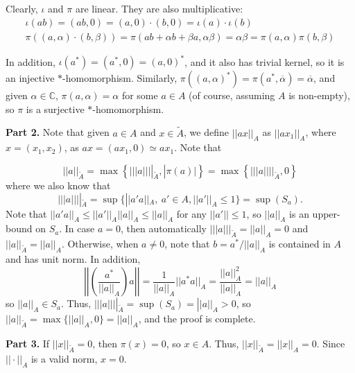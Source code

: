 \documentclass[aps,pra,showpacs,notitlepage,onecolumn,superscriptaddress,nofootinbib]{revtex4-1}
\theoremstyle{definition}
\begin{document}
Clearly, $\iota$ and $\pi$ are linear. They are also multiplicative:
\begin{align}
  \iota(ab) = (ab, 0) = (a, 0) \cdot (b, 0) = \iota(a) \cdot \iota(b) \\
  \pi((a, \alpha) \cdot (b, \beta)) = \pi(ab + \alpha b + \beta a, \alpha \beta) = \alpha \beta = \pi(a, \alpha) \pi(b, \beta)
  \end{align}

\noindent 
In addition, $\iota(a^{*}) = (a^{*}, 0) = (a, 0)^{*}$, and it also has trivial kernel, so it is an injective $*$-homomorphism. Similarly, $\pi((a, \alpha)^{*}) = \pi(a^{*}, \overline{\alpha}) = \overline{\alpha}$,
and given $\alpha \in \mathbb{C}$, $\pi(a, \alpha) = \alpha$ for some $a \in A$ (of course, assuming $A$ is non-empty), so $\pi$ is a surjective $*$-homomorphism.
\newline

\noindent \textbf{Part 2.} Note that given $a \in A$ and $x \in \widetilde{A}$, we define $||ax||_A$ as $||a x_1||_A$, where $x = (x_1, x_2)$, as $ax = (ax_1, 0) \simeq ax_1$. Note that

\begin{equation}
  ||a||_{\widetilde{A}} = \max \left\{ |||a||||_{\widetilde{A}}, |\pi(a)| \right\} = \max \left\{ |||a||||_{\widetilde{A}}, 0 \right\}
\end{equation}
where we also know that
\begin{equation}
  |||a||||_{\widetilde{A}} = \sup \{ ||a' a||_{A}, \ a' \in A, ||a'||_A \leq 1\} = \sup(S_a).
\end{equation}
Note that $||a' a||_A \leq ||a'||_A ||a||_A \leq ||a||_A$ for any $||a'|| \leq 1$, so $||a||_A$ is an upper-bound on $S_a$. In case $a = 0$, then automatically $|||a|||_{\widetilde{A}} = ||a||_A = 0$ and $||a||_{\widetilde{A}} = ||a||_A$.
Otherwise, when $a \neq 0$, note that $b = a^{*}/||a||_A$ is contained in $A$ and has unit norm. In addition,
\begin{equation}
  \left|\left| \left( \frac{a^{*}}{||a||_A} \right) a \right|\right| = \frac{1}{||a||_A} ||a^{*} a||_A = \frac{||a||_A^2}{||a||_A} = ||a||_A
\end{equation}
so $||a||_A \in S_a$. Thus, $|||a||||_{\widetilde{A}} = \sup(S_a) = ||a||_A > 0$, so $||a||_{\widetilde{A}} = \max \{ ||a||_A, 0 \} = ||a||_A$, and the proof is complete.
\newline

\noindent \textbf{Part 3.} If $||x||_{\widetilde{A}} = 0$, then $\pi(x) = 0$, so $x \in A$. Thus, $||x||_{\widetilde{A}} = ||x||_{A} = 0$. Since $||\cdot||_A$ is a valid norm, $x = 0$.
\newline
\end{document}
